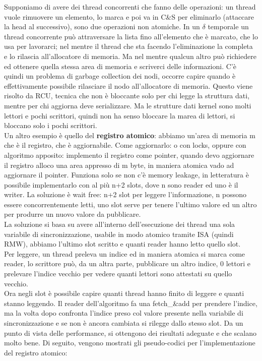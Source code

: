 \documentclass[12pt, oneside]{extbook}
\begin{document}
Supponiamo di avere dei thread concorrenti che fanno delle operazioni: un thread vuole rimuovere un elemento, lo marca e poi va in C\&S per eliminarlo (attaccare la head al successivo), sono due operazioni non atomiche. In un $\delta$ temporale un thread concorrente può attraversare la lista fino all'elemento che è marcato, che lo usa per lavorarci; nel mentre il thread che sta facendo l'eliminazione la completa e lo rilascia all'allocatore di memoria. Ma nel mentre qualcun altro può richiedere ed ottenere quella stessa area di memoria e scriverci delle informazioni. C'è quindi un problema di garbage collection dei nodi, occorre capire quando è effettivamente possibile rilasciare il nodo all'allocatore di memoria. Questo viene risolto da RCU, tecnica che non è bloccante solo per chi legge la struttura dati, mentre per chi aggiorna deve serializzare. Ma le strutture dati kernel sono molti lettori e pochi scrittori, quindi non ha senso bloccare la marea di lettori, si bloccano solo i pochi scrittori.\\ Un altro esempio è quello del \textbf{registro atomico}: abbiamo un'area di memoria m che è il registro, che è aggiornabile. Come aggiornarlo: o con locks, oppure con algoritmo apposito: implemento il registro come pointer, quando devo aggiornare il registro alloco una area appresso di m byte, in maniera atomica vado ad aggiornare  il pointer. Funziona solo se non c'è memory leakage, in letteratura è possibile implementarlo con al più n+2 slots, dove n sono reader ed uno è il writer. La soluzione è wait free: n+2 slot per leggere l'informazione, n possono essere concorrentemente letti, uno slot serve per tenere l'ultimo valore ed un altro per produrre un nuovo valore da pubblicare.\\ La soluzione si basa su avere all'interno dell'esecuzione dei thread una sola variabile di sincronizzazione, usabile in modo atomico tramite ISA (quindi RMW), abbiamo l'ultimo slot scritto e quanti reader hanno letto quello slot.\\ Per leggere, un thread preleva un indice ed in maniera atomica si marca come reader, lo scrittore può, da un altra parte, pubblicare un altro indice, 0 lettori e prelevare l'indice vecchio per vedere quanti lettori sono attestati su quello vecchio.\\ Ora negli slot è possibile capire quanti thread hanno finito di leggere e quanti stanno leggendo. Il reader dell'algoritmo fa una fetch\_\&add per prendere l'indice, ma la volta dopo confronta l'indice preso col valore presente nella variabile di sincronizzazione e se non è ancora cambiata si rilegge dallo stesso slot. Da un punto di vista delle performance, si ottengono dei risultati adeguate e che scalano molto bene. Di seguito, vengono mostrati gli pseudo-codici per l'implementazione del registro atomico:\\\\
\end{document}
